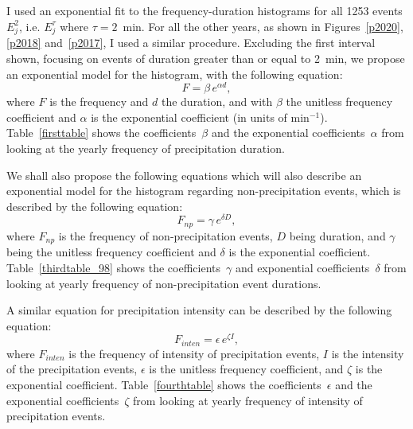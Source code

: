 \documentclass[11pt]{report}
\begin{document}
I used an exponential fit to the frequency-duration histograms for all 1253
events $E_j^2$, i.e. $E_j^\tau$ where $\tau=2$~min. For all the other years,
as shown in Figures~\ref{p2020}, \ref{p2018} and~\ref{p2017}, I used a
similar procedure. Excluding the first interval shown, focusing on events of
duration greater than or equal to 2~min, we propose an exponential model for
the histogram, with the following equation:
\begin{equation}\label{expod}
  F = \beta \,e^{\alpha d},
\end{equation}
where $F$ is the frequency and $d$ the duration, and with $\beta$ the
unitless frequency coefficient and $\alpha$ is the exponential coefficient
(in units of min$^{-1}$). Table~\ref{firsttable} shows the
coefficients~$\beta$ and the exponential coefficients~$\alpha$ from looking
at the yearly frequency of precipitation duration.

We shall also propose the following equations which will also describe an
exponential model for the histogram regarding non-precipitation events,
which is described by the following equation:
\begin{equation}\label{expod_np}
	F_{np} = \gamma \,e^{\delta D},
\end{equation}
where $F_{np}$ is the frequency of non-precipitation events, $D$ being
duration, and $\gamma $ being the unitless frequency coefficient and
$\delta$ is the exponential coefficient. Table~\ref{thirdtable_98} shows the
coefficients~$\gamma$ and exponential coefficients~$\delta$ from looking at
yearly frequency of non-precipitation event durations.

A similar equation for precipitation intensity can be described by the
following equation:
\begin{equation}\label{expod_inten}
  F_{inten} = \epsilon \,e^{\zeta I},
\end{equation}
where $F_{inten}$ is the frequency of intensity of precipitation events, $I$
is the intensity of the precipitation events, $\epsilon$ is the unitless
frequency coefficient, and $\zeta$ is the exponential
coefficient. Table~\ref{fourthtable} shows the coefficients~$\epsilon$ and
the exponential coefficients~$\zeta$ from looking at yearly frequency of
intensity of precipitation events.
\end{document}
